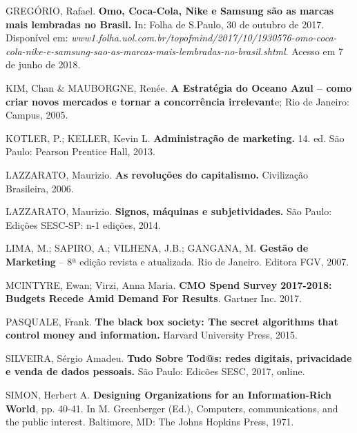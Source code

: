 GREGÓRIO, Rafael. \textbf{Omo, Coca-Cola, Nike e Samsung são as marcas
mais lembradas no Brasil.} In: Folha de S.Paulo, 30 de outubro de 2017.
Disponível em:
\emph{www1.folha.uol.com.br/topofmind/2017/10/1930576-omo-coca-cola-nike-e-samsung-sao-as-marcas-mais-lembradas-no-brasil.shtml}.
Acesso em 7 de junho de 2018.

KIM, Chan \& MAUBORGNE, Renée. \textbf{A Estratégia do Oceano Azul --
como criar novos mercados e tornar a concorrência irrelevant}e; Rio de
Janeiro: Campus, 2005.

KOTLER, P.; KELLER, Kevin L. \textbf{Administração de marketing.} 14.
ed. São Paulo: Pearson Prentice Hall, 2013.

LAZZARATO, Maurizio. \textbf{As revoluções do capitalismo.} Civilização
Brasileira, 2006.

LAZZARATO, Maurizio. \textbf{Signos, máquinas e subjetividades.} São
Paulo: Edições SESC-SP: n-1 edições, 2014.

LIMA, M.; SAPIRO, A.; VILHENA, J.B.; GANGANA, M. \textbf{Gestão de
Marketing} -- 8ª edição revista e atualizada. Rio de Janeiro. Editora
FGV, 2007.

MCINTYRE, Ewan; Virzi, Anna Maria. \textbf{CMO Spend Survey 2017-2018:
Budgets Recede Amid Demand For Results}. Gartner Inc. 2017.

PASQUALE, Frank. \textbf{The black box society: The secret algorithms
that control money and information.} Harvard University Press, 2015.

SILVEIRA, Sérgio Amadeu. \textbf{Tudo Sobre Tod@s: redes digitais,
privacidade e venda de dados pessoais.} São Paulo: Edicões SESC, 2017,
online.

SIMON, Herbert A. \textbf{Designing Organizations for an
Information-Rich World}, pp. 40-41. In M. Greenberger (Ed.), Computers,
communications, and the public interest. Baltimore, MD: The Johns
Hopkins Press, 1971.
